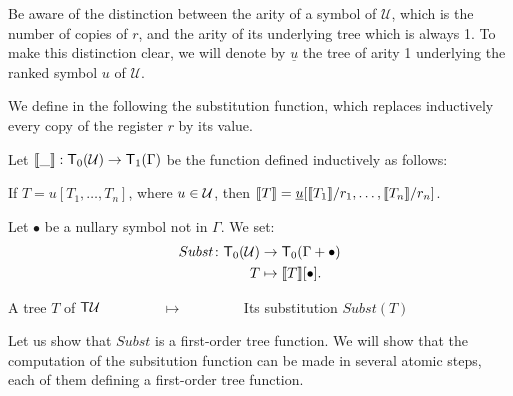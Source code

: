Be aware of the distinction between the arity of a symbol of $\mathcal{U}$, which is the number of copies of $r$, and the arity of its underlying tree which is always 1. To make this distinction clear, we will denote by $\underline{u}$ the tree of arity 1 underlying the ranked symbol $u$ of $\mathcal{U}$. 

We define in the following the substitution function, which replaces inductively every copy of the register $r$ by its value.
\begin{definition}
Let $\llbracket \_ \rrbracket:\mathsf T_0({\mathcal U})\to \mathsf T_1(\Gamma)$ be the function defined inductively as follows:

If $T=u[T_1,\dots,T_n]$, where $u\in{\mathcal U}$, then $\llbracket T \rrbracket=\underline{u}[\llbracket T_1 \rrbracket/r_1,\dots,\llbracket T_n \rrbracket/r_n]$. 


\noindent Let $\bullet$ be a nullary symbol not in $\Gamma$. We set: 
\begin{align*}
  Subst \colon\mathsf T_0({\mathcal U}) &\to \mathsf T_0(\Gamma+\bullet)\\
  T &\mapsto \llbracket T \rrbracket[\bullet].
\end{align*} 
\end{definition}

\begin{example}
\begin{center}
A tree $T$ of $\mathsf T {\mathcal U}$ $\qquad\qquad\mapsto\qquad\qquad$ Its substitution $Subst(T)$ 
\end{center}
\end{example}

Let us show that $Subst$ is a first-order tree function. We will show that the computation of the subsitution function can be made in several atomic steps, each of them defining a first-order tree function.
 
